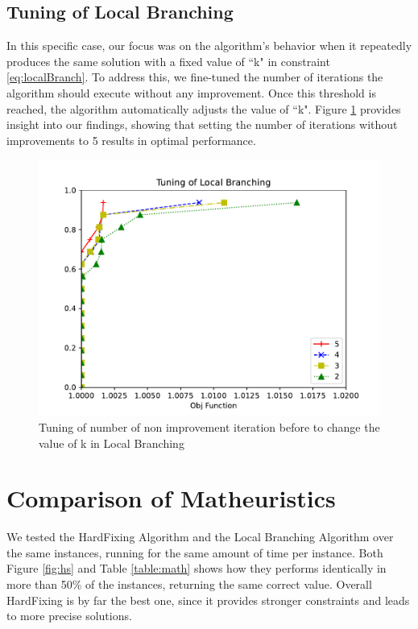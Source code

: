 \subsection{Tuning of Local Branching}
In this specific case, our focus was on the algorithm's behavior when it repeatedly produces the same solution with a fixed value of ``k" in constraint \ref{eq:localBranch}. To address this, we fine-tuned the number of iterations the algorithm should execute without any improvement. Once this threshold is reached, the algorithm automatically adjusts the value of ``k". Figure \ref{fig:soft} provides insight into our findings, showing that setting the number of iterations without improvements to 5 results in optimal performance.
\begin{figure}[!h]
    \centering
    \includegraphics[width=\textwidth]{images/soft.pdf}
    \caption{Tuning of number of non improvement iteration before to change the value of k in Local Branching}
    \label{fig:soft}
\end{figure}


\section{Comparison of Matheuristics}

We tested the HardFixing Algorithm and the Local Branching Algorithm over the same instances, running for the same amount of time per instance. Both Figure \ref{fig:hs} and Table \ref{table:math} shows how they performs identically in more than 50\% of the instances, returning the same correct value. Overall HardFixing is by far the best one, since it provides stronger constraints and leads to more precise solutions. 

